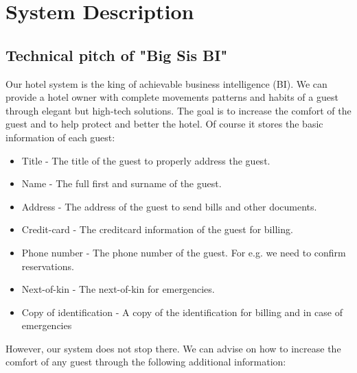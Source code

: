 \chapter{System Description}

\section{Technical pitch of "Big Sis BI"}
Our hotel system is the king of achievable business intelligence (BI). We can provide a hotel owner with complete movements patterns and habits of a guest through elegant but high-tech solutions. The goal is to increase the comfort of the guest and to help protect and better the hotel. Of course it stores the basic information of each guest:

\begin{itemize}
	\item Title - The title of the guest to properly address the guest.
	\item Name - The full first and surname of the guest.
	\item Address - The address of the guest to send bills and other documents.
	\item Credit-card - The creditcard information of the guest for billing.
	\item Phone number - The phone number of the guest. For e.g. we need to confirm reservations.
	\item Next-of-kin - The next-of-kin for emergencies.
	\item Copy of identification - A copy of the identification for billing and in case of emergencies
\end{itemize}

However, our system does not stop there. We can advise on how to increase the comfort of any guest through the following additional information:

